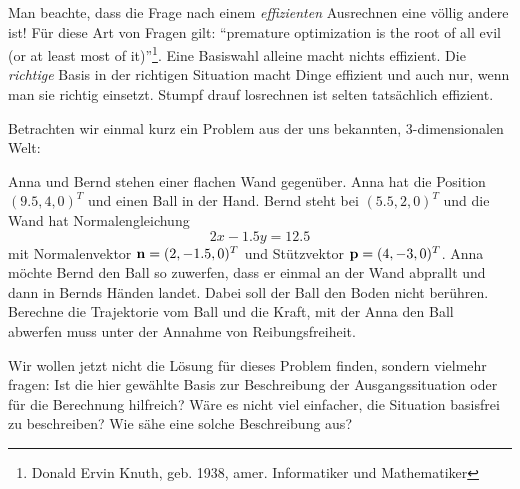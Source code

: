 \begin{remark}
\begin{itemize}
\medbreak
Man beachte, dass die Frage nach einem \emph{effizienten} Ausrechnen eine völlig andere ist! Für diese Art von Fragen gilt: \enquote{premature optimization is the root of all evil (or at least most of it)}\footnote{Donald Ervin Knuth, geb. 1938, amer. Informatiker und Mathematiker}. Eine Basiswahl alleine macht nichts effizient. Die \emph{richtige} Basis in der richtigen Situation macht Dinge effizient und auch nur, wenn man sie richtig einsetzt. Stumpf drauf losrechnen ist selten tatsächlich effizient.
\end{itemize}

\medbreak
Betrachten wir einmal kurz ein Problem aus der uns bekannten, 3-dimensionalen Welt: 

\begin{gridmp}{\linewidth}
	{\selectfont
		Anna und Bernd stehen einer flachen Wand gegenüber. Anna hat die Position $(9.5, 4,0)^T$ und  einen Ball in der Hand. Bernd steht bei $(5.5, 2, 0)^T$ und die Wand hat Normalengleichung \[2x-1.5y = 12.5\] mit Normalenvektor $\mathbf{n}=(2,-1.5,0)^T$ und Stützvektor $\mathbf{p}=(4,-3,0)^T$. 
		Anna möchte Bernd den Ball so zuwerfen, dass er einmal an der Wand abprallt und dann in Bernds Händen landet. Dabei soll der Ball den Boden nicht berühren. Berechne die Trajektorie vom Ball und die Kraft, mit der Anna den Ball abwerfen muss unter der Annahme von Reibungsfreiheit.}
	\vspace{8cm}
\end{gridmp}

Wir wollen jetzt nicht die Lösung für dieses Problem finden, sondern vielmehr fragen: Ist die hier gewählte Basis zur Beschreibung der Ausgangssituation oder für die Berechnung hilfreich? Wäre es nicht viel einfacher, die Situation basisfrei zu beschreiben? Wie sähe eine solche Beschreibung aus?

\end{remark}

